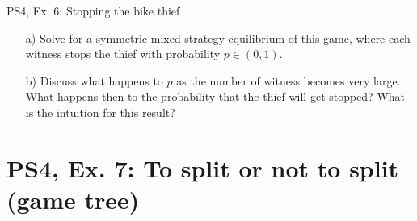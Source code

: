 \begin{frame}{PS4, Ex. 6: Stopping the bike thief}
    \begin{itemize}
      \item[a)] Solve for a symmetric mixed strategy equilibrium of this game, where each witness stops the thief with probability $p\in(0,1)$.
    \end{itemize}
    \begin{itemize}
      \item[b)] Discuss what happens to $p$ as the number of witness becomes very large. What happens then to the probability that the thief will get stopped? What is the intuition for this result?
    \end{itemize}
\end{frame}


\section{PS4, Ex. 7: To split or not to split (game tree)}

